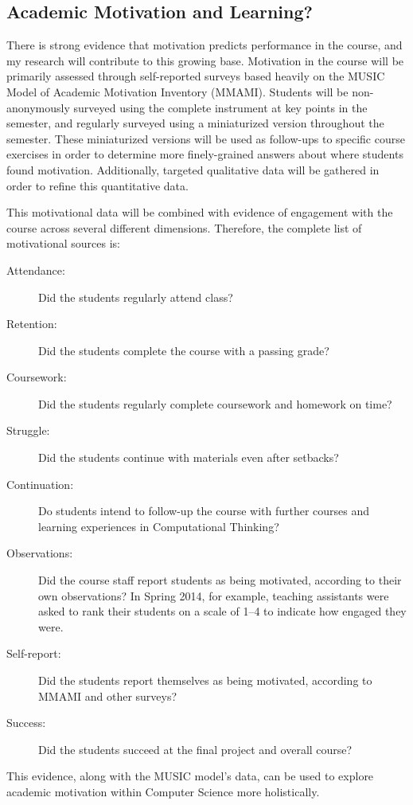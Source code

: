 \subsection{Academic Motivation and Learning?}
There is strong evidence that motivation predicts performance in the course, and my research will contribute to this growing base.
Motivation in the course will be primarily assessed through self-reported surveys based heavily on the MUSIC Model of Academic Motivation Inventory (MMAMI).
Students will be non-anonymously surveyed using the complete instrument at key points in the semester, and regularly surveyed using a miniaturized version throughout the semester.
These miniaturized versions will be used as follow-ups to specific course exercises in order to determine more finely-grained answers about where students found motivation.
Additionally, targeted qualitative data will be gathered in order to refine this quantitative data.

This motivational data will be combined with evidence of engagement with the course across several different dimensions. Therefore, the complete list of motivational sources is:
\begin{description}
	\item[Attendance:] Did the students regularly attend class?
	\item[Retention:] Did the students complete the course with a passing grade?
	\item[Coursework:] Did the students regularly complete coursework and homework on time?
	\item[Struggle:] Did the students continue with materials even after setbacks?
	\item[Continuation:] Do students intend to follow-up the course with further courses and learning experiences in Computational Thinking?
	\item[Observations:] Did the course staff report students as being motivated, according to their own observations? In Spring 2014, for example, teaching assistants were asked to rank their students on a scale of 1--4 to indicate how engaged they were.
	\item[Self-report:] Did the students report themselves as being motivated, according to MMAMI and other surveys?
	\item[Success:] Did the students succeed at the final project and overall course?
\end{description}
This evidence, along with the MUSIC model's data, can be used to explore academic motivation within Computer Science more holistically.

